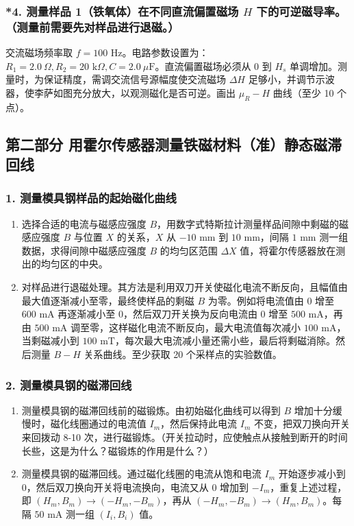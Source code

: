 \documentclass[11pt]{article}
\begin{document}
\subsubsection{*4. 测量样品 1（铁氧体）在不同直流偏置磁场 $H$ 下的可逆磁导率。（测量前需要先对样品进行退磁。）}

交流磁场频率取 $f=100\text{ Hz}$。电路参数设置为：$R_1=2.0\ \Omega, R_2=20\text{ k}\Omega, C=2.0\ \mu\text{F}$。直流偏置磁场必须从 0 到 $H_s$ 单调增加。测量时，为保证精度，需调交流信号源幅度使交流磁场 $\Delta H$ 足够小，并调节示波器，使李萨如图充分放大，以观测磁化是否可逆。画出 $\mu_R - H$ 曲线（至少 10 个点）。

\subsection{第二部分 用霍尔传感器测量铁磁材料（准）静态磁滞回线}

\subsubsection{1. 测量模具钢样品的起始磁化曲线}

\begin{enumerate}
    \item[1)] 选择合适的电流与磁感应强度 $B$，用数字式特斯拉计测量样品间隙中剩磁的磁感应强度 $B$ 与位置 $X$ 的关系，$X$ 从 $-10\text{ mm}$ 到 $10\text{ mm}$，间隔 $1\text{ mm}$ 测一组数据，求得间隙中磁感应强度 $B$ 的均匀区范围 $\Delta X$ 值，将霍尔传感器放在测出的均匀区的中央。
    
    \item[2)] 对样品进行退磁处理。其方法是利用双刀开关使磁化电流不断反向，且幅值由最大值逐渐减小至零，最终使样品的剩磁 $B$ 为零。例如将电流值由 0 增至 $600\text{ mA}$ 再逐渐减小至 0，然后双刀开关换为反向电流由 0 增至 $500\text{ mA}$，再由 $500\text{ mA}$ 调至零，这样磁化电流不断反向，最大电流值每次减小 $100\text{ mA}$，当剩磁减小到 $100\text{ mT}$，每次最大电流减小量还需小些，最后将剩磁消除。然后测量 $B-H$ 关系曲线。至少获取 20 个采样点的实验数值。
\end{enumerate}

\subsubsection{2. 测量模具钢的磁滞回线}

\begin{enumerate}
    \item[1)] 测量模具钢的磁滞回线前的磁锻炼。由初始磁化曲线可以得到 $B$ 增加十分缓慢时，磁化线圈通过的电流值 $I_m$，然后保持此电流 $I_m$ 不变，把双刀换向开关来回拨动 8-10 次，进行磁锻炼。（开关拉动时，应使触点从接触到断开的时间长些，这是为什么？磁锻炼的作用是什么？）
    
    \item[2)] 测量模具钢的磁滞回线。通过磁化线圈的电流从饱和电流 $I_m$ 开始逐步减小到 0，然后双刀换向开关将电流换向，电流又从 0 增加到 $-I_m$，重复上述过程，即 $(H_m, B_m) \to (-H_m, -B_m)$，再从 $(-H_m, -B_m) \to (H_m, B_m)$。每隔 $50\text{ mA}$ 测一组 $(I_i, B_i)$ 值。
\end{enumerate}
\end{document}
